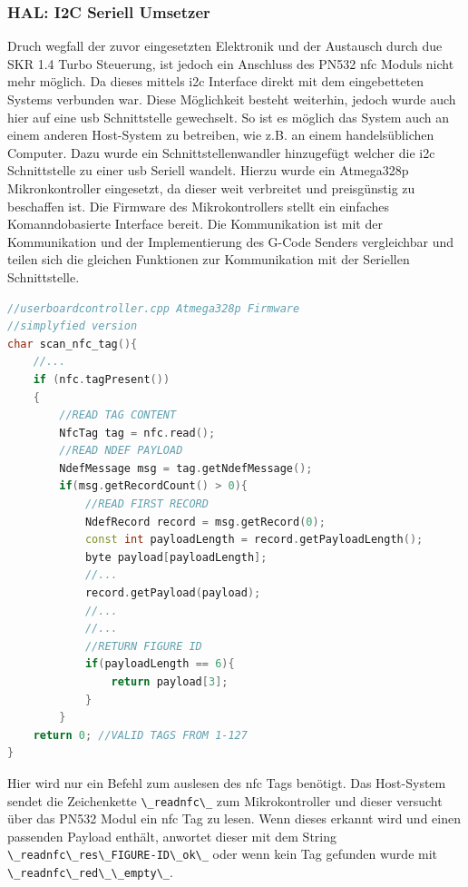 \hypertarget{hal-i2c-seriell-umsetzer}{%
\subsubsection{HAL: I2C Seriell
Umsetzer}\label{hal-i2c-seriell-umsetzer}}

Druch wegfall der zuvor eingesetzten Elektronik und der Austausch durch
due SKR 1.4 Turbo Steuerung, ist jedoch ein Anschluss des PN532
\gls{nfc} Moduls nicht mehr möglich. Da dieses mittels \gls{i2c}
Interface direkt mit dem eingebetteten Systems verbunden war. Diese
Möglichkeit besteht weiterhin, jedoch wurde auch hier auf eine \gls{usb}
Schnittstelle gewechselt. So ist es möglich das System auch an einem
anderen Host-System zu betreiben, wie z.B. an einem handelsüblichen
Computer. Dazu wurde ein Schnittstellenwandler hinzugefügt welcher die
\gls{i2c} Schnittstelle zu einer \gls{usb} Seriell wandelt. Hierzu wurde
ein Atmega328p Mikronkontroller eingesetzt, da dieser weit verbreitet
und preisgünstig zu beschaffen ist. Die Firmware des Mikrokontrollers
stellt ein einfaches Komanndobasierte Interface bereit. Die
Kommunikation ist mit der Kommunikation und der Implementierung des
G-Code Senders vergleichbar und teilen sich die gleichen Funktionen zur
Kommunikation mit der Seriellen Schnittstelle.

\begin{lstlisting}[language={C++}]
//userboardcontroller.cpp Atmega328p Firmware
//simplyfied version
char scan_nfc_tag(){
    //...
    if (nfc.tagPresent())
    {
        //READ TAG CONTENT
        NfcTag tag = nfc.read();
        //READ NDEF PAYLOAD
        NdefMessage msg = tag.getNdefMessage();
        if(msg.getRecordCount() > 0){
            //READ FIRST RECORD
            NdefRecord record = msg.getRecord(0);
            const int payloadLength = record.getPayloadLength();
            byte payload[payloadLength];
            //...
            record.getPayload(payload);
            //...
            //...
            //RETURN FIGURE ID
            if(payloadLength == 6){
                return payload[3];
            }
        }
    return 0; //VALID TAGS FROM 1-127
}
\end{lstlisting}

Hier wird nur ein Befehl zum auslesen des \gls{nfc} Tags benötigt. Das
Host-System sendet die Zeichenkette
\passthrough{\lstinline!\_readnfc\_!} zum Mikrokontroller und dieser
versucht über das PN532 Modul ein \gls{nfc} Tag zu lesen. Wenn dieses
erkannt wird und einen passenden Payload enthält, anwortet dieser mit
dem String \passthrough{\lstinline!\_readnfc\_res\_FIGURE-ID\_ok\_!}
oder wenn kein Tag gefunden wurde mit
\passthrough{\lstinline!\_readnfc\_red\_\_empty\_!}.

